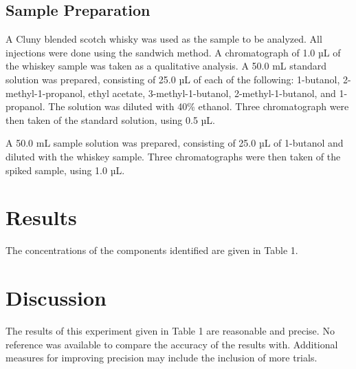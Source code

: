 \documentclass{article}
\begin{document}
\begin{multicols}{2}
{\subsection*{Sample Preparation}
A Cluny blended scotch whisky was used as the sample to be analyzed.
All injections were done using the sandwich method.
A chromatograph of 1.0 µL of the whiskey sample was taken as a qualitative
    analysis. 
A 50.0 mL standard solution was prepared, consisting of 25.0 µL of each of the
    following: 1-butanol, 2-methyl-1-propanol, ethyl acetate,
    3-methyl-1-butanol, 2-methyl-1-butanol, and 1-propanol. The solution was
    diluted with 40\% ethanol. Three chromatograph were then taken of the standard
    solution, using 0.5 µL.

A 50.0 mL sample solution was prepared, consisting of 25.0 µL of 1-butanol and
    diluted with the whiskey sample. Three chromatographs were then taken of the
    spiked sample, using 1.0 µL.

\section*{Results}

The concentrations of the components identified are given in Table 1.

  \begin{center} 
  \end{center}


\section*{Discussion}
The results of this experiment given in Table 1 are reasonable and precise.
No reference was available to compare the accuracy of the results with.
Additional measures for improving precision may include the inclusion of more
trials.

}
\end{multicols}
\end{document}
